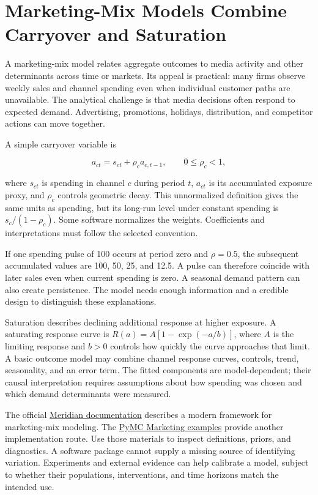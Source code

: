\hypertarget{M08-marketing-mix-models-combine-carryover-and-saturation}{%
\section{Marketing-Mix Models Combine Carryover and
Saturation}\label{M08-marketing-mix-models-combine-carryover-and-saturation}}

\noindent A marketing-mix model relates aggregate outcomes to media activity and
other determinants across time or markets. Its appeal is practical: many
firms observe weekly sales and channel spending even when individual
customer paths are unavailable. The analytical challenge is that media
decisions often respond to expected demand. Advertising, promotions,
holidays, distribution, and competitor actions can move together.

A simple carryover variable is

\[
a_{ct}=s_{ct}+\rho_c a_{c,t-1},\qquad 0\leq\rho_c<1,
\]

where \(s_{ct}\) is spending in channel \(c\) during period \(t\),
\(a_{ct}\) is its accumulated exposure proxy, and \(\rho_c\) controls
geometric decay. This unnormalized definition gives the same units as
spending, but its long-run level under constant spending is
\(s_c/(1-\rho_c)\). Some software normalizes the weights. Coefficients
and interpretations must follow the selected convention.

If one spending pulse of 100 occurs at period zero and \(\rho=0.5\), the
subsequent accumulated values are 100, 50, 25, and 12.5. A pulse can
therefore coincide with later sales even when current spending is zero.
A seasonal demand pattern can also create persistence. The model needs
enough information and a credible design to distinguish these
explanations.

Saturation describes declining additional response at higher exposure. A
saturating response curve is \(R(a)=A[1-\exp(-a/b)]\), where \(A\) is
the limiting response and \(b>0\) controls how quickly the curve
approaches that limit. A basic outcome model may combine channel
response curves, controls, trend, seasonality, and an error term. The
fitted components are model-dependent; their causal interpretation
requires assumptions about how spending was chosen and which demand
determinants were measured.

The official
\href{https://developers.google.com/meridian/docs/basics/meridian-introduction}{Meridian
documentation} describes a modern framework for marketing-mix modeling.
The
\href{https://www.pymc-marketing.io/en/latest/notebooks/mmm/mmm_example.html}{PyMC
Marketing examples} provide another implementation route. Use those
materials to inspect definitions, priors, and diagnostics. A software
package cannot supply a missing source of identifying variation.
Experiments and external evidence can help calibrate a model, subject to
whether their populations, interventions, and time horizons match the
intended use.

